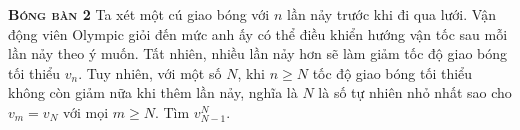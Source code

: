 
\begin{problem}{\textbf{\textsc{Bóng bàn 2}}} Ta xét một cú giao bóng với $n$ lần nảy trước khi đi qua lưới. Vận động viên Olympic giỏi đến mức anh ấy có thể điều khiển hướng vận tốc sau mỗi lần nảy theo ý muốn. Tất nhiên, nhiều lần nảy hơn sẽ làm giảm tốc độ giao bóng tối thiểu $v_n$. Tuy nhiên, với một số $N$, khi $n\geq N$ tốc độ giao bóng tối thiểu không còn giảm nữa khi thêm lần nảy, nghĩa là $N$ là số tự nhiên nhỏ nhất sao cho $v_m=v_N$ với mọi $m\geq N.$ Tìm $v_{N-1}^N$.
	
\end{problem}
